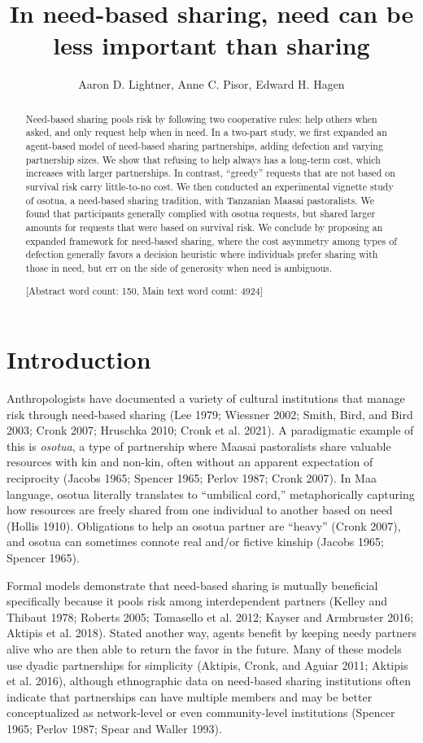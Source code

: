 \documentclass[
]{article}
\title{In need-based sharing, need can be less important than sharing}
\author{Aaron D. Lightner, Anne C. Pisor, Edward H. Hagen}
\date{}
\begin{document}
\maketitle
\begin{abstract}
Need-based sharing pools risk by following two cooperative rules: help others when asked, and only request help when in need. In a two-part study, we first expanded an agent-based model of need-based sharing partnerships, adding defection and varying partnership sizes. We show that refusing to help always has a long-term cost, which increases with larger partnerships. In contrast, ``greedy'' requests that are not based on survival risk carry little-to-no cost. We then conducted an experimental vignette study of osotua, a need-based sharing tradition, with Tanzanian Maasai pastoralists. We found that participants generally complied with osotua requests, but shared larger amounts for requests that were based on survival risk. We conclude by proposing an expanded framework for need-based sharing, where the cost asymmetry among types of defection generally favors a decision heuristic where individuals prefer sharing with those in need, but err on the side of generosity when need is ambiguous.

{[}Abstract word count: 150, Main text word count: 4924{]}
\end{abstract}

\section{Introduction}

Anthropologists have documented a variety of cultural institutions that manage risk through need-based sharing (Lee 1979; Wiessner 2002; Smith, Bird, and Bird 2003; Cronk 2007; Hruschka 2010; Cronk et al. 2021). A paradigmatic example of this is \emph{osotua}, a type of partnership where Maasai pastoralists share valuable resources with kin and non-kin, often without an apparent expectation of reciprocity (Jacobs 1965; Spencer 1965; Perlov 1987; Cronk 2007). In Maa language, osotua literally translates to ``umbilical cord,'' metaphorically capturing how resources are freely shared from one individual to another based on need (Hollis 1910). Obligations to help an osotua partner are ``heavy'' (Cronk 2007), and osotua can sometimes connote real and/or fictive kinship (Jacobs 1965; Spencer 1965).

Formal models demonstrate that need-based sharing is mutually beneficial specifically because it pools risk among interdependent partners (Kelley and Thibaut 1978; Roberts 2005; Tomasello et al. 2012; Kayser and Armbruster 2016; Aktipis et al. 2018). Stated another way, agents benefit by keeping needy partners alive who are then able to return the favor in the future. Many of these models use dyadic partnerships for simplicity (Aktipis, Cronk, and Aguiar 2011; Aktipis et al. 2016), although ethnographic data on need-based sharing institutions often indicate that partnerships can have multiple members and may be better conceptualized as network-level or even community-level institutions (Spencer 1965; Perlov 1987; Spear and Waller 1993).
\end{document}
